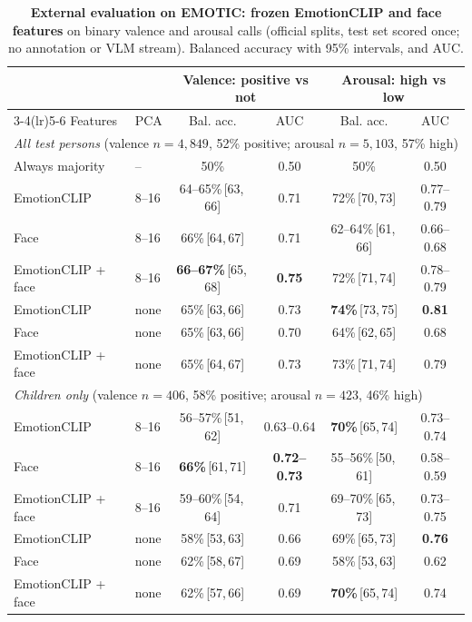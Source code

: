 \documentclass[11pt]{article}
\newcommand{\best}[1]{\textbf{#1}}
\newcommand{\ci}[2]{\,[#1,\,#2]}
\begin{document}
\begin{table}[!htbp]
\centering
\caption{\textbf{External evaluation on EMOTIC: frozen EmotionCLIP and face features} on binary valence and arousal calls (official splits, test set scored once; no annotation or VLM stream). Balanced accuracy with 95\% intervals, and AUC.}
\label{tab:emotic}
\small
\begin{tabular}{llcccc}
\toprule
 & & \multicolumn{2}{c}{Valence: positive vs not} & \multicolumn{2}{c}{Arousal: high vs low} \\
\cmidrule(lr){3-4}\cmidrule(lr){5-6}
Features & PCA & Bal. acc. & AUC & Bal. acc. & AUC \\
\midrule
\multicolumn{6}{l}{\emph{All test persons} (valence $n{=}4{,}849$, 52\% positive; arousal $n{=}5{,}103$, 57\% high)} \\
Always majority & -- & 50\% & 0.50 & 50\% & 0.50 \\
EmotionCLIP & 8--16 & 64--65\%\ci{63}{66} & 0.71 & 72\%\ci{70}{73} & 0.77--0.79 \\
Face & 8--16 & 66\%\ci{64}{67} & 0.71 & 62--64\%\ci{61}{66} & 0.66--0.68 \\
EmotionCLIP + face & 8--16 & \best{66--67\%}\ci{65}{68} & \best{0.75} & 72\%\ci{71}{74} & 0.78--0.79 \\
EmotionCLIP & none & 65\%\ci{63}{66} & 0.73 & \best{74\%}\ci{73}{75} & \best{0.81} \\
Face & none & 65\%\ci{63}{66} & 0.70 & 64\%\ci{62}{65} & 0.68 \\
EmotionCLIP + face & none & 65\%\ci{64}{67} & 0.73 & 73\%\ci{71}{74} & 0.79 \\
\midrule
\multicolumn{6}{l}{\emph{Children only} (valence $n{=}406$, 58\% positive; arousal $n{=}423$, 46\% high)} \\
EmotionCLIP & 8--16 & 56--57\%\ci{51}{62} & 0.63--0.64 & \best{70\%}\ci{65}{74} & 0.73--0.74 \\
Face & 8--16 & \best{66\%}\ci{61}{71} & \best{0.72--0.73} & 55--56\%\ci{50}{61} & 0.58--0.59 \\
EmotionCLIP + face & 8--16 & 59--60\%\ci{54}{64} & 0.71 & 69--70\%\ci{65}{73} & 0.73--0.75 \\
EmotionCLIP & none & 58\%\ci{53}{63} & 0.66 & 69\%\ci{65}{73} & \best{0.76} \\
Face & none & 62\%\ci{58}{67} & 0.69 & 58\%\ci{53}{63} & 0.62 \\
EmotionCLIP + face & none & 62\%\ci{57}{66} & 0.69 & \best{70\%}\ci{65}{74} & 0.74 \\
\bottomrule
\end{tabular}

\end{table}
\end{document}
